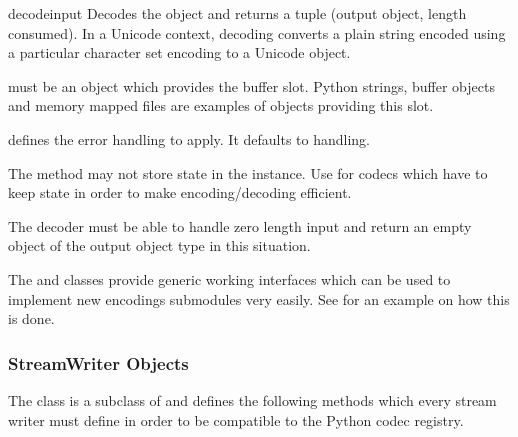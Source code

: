 \begin{methoddesc}{decode}{input}
  Decodes the object  and returns a tuple (output object,
  length consumed).  In a Unicode context, decoding converts a plain string
  encoded using a particular character set encoding to a Unicode object.

   must be an object which provides the 
  buffer slot.  Python strings, buffer objects and memory mapped files
  are examples of objects providing this slot.

   defines the error handling to apply. It defaults to
   handling.

  The method may not store state in the  instance. Use
   for codecs which have to keep state in order to
  make encoding/decoding efficient.

  The decoder must be able to handle zero length input and return an
  empty object of the output object type in this situation.
\end{methoddesc}

The  and  classes provide
generic working interfaces which can be used to implement new
encodings submodules very easily. See  for an
example on how this is done.


\subsubsection{StreamWriter Objects \label{stream-writer-objects}}

The  class is a subclass of  and
defines the following methods which every stream writer must define in
order to be compatible to the Python codec registry.

